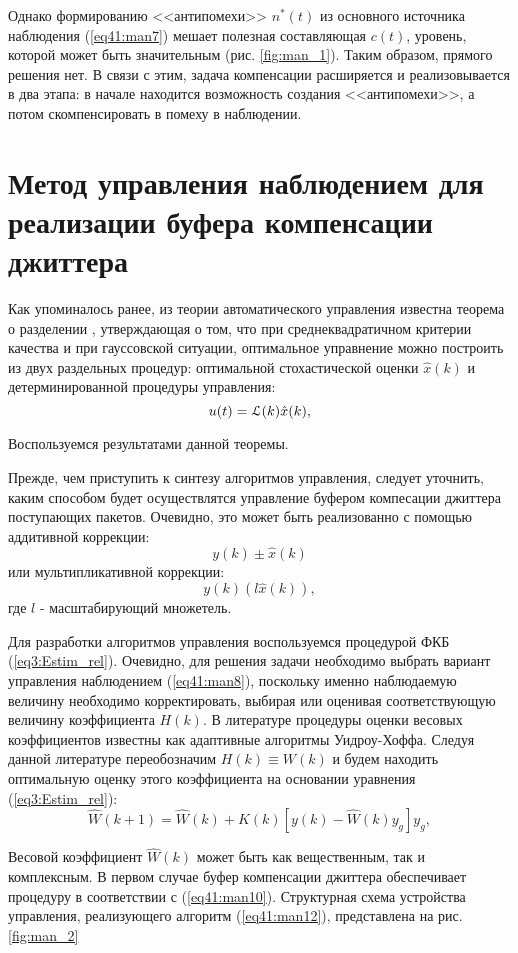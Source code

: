Однако формированию <<антипомехи>> $n^*(t)$ из основного источника наблюдения (\ref{eq41:man7}) мешает полезная составляющая $c(t)$, уровень, которой может быть значительным (рис. \ref{fig:man_1}).
Таким образом, прямого решения нет.
В связи с этим, задача компенсации расширяется и реализовывается в два этапа: в начале находится возможность создания <<антипомехи>>, а потом скомпенсировать в помеху в наблюдении.


\section{Метод управления наблюдением для реализации буфера компенсации джиттера}

Как упоминалось ранее, из теории автоматического управления известна теорема о разделении \cite{seij, red}, утверждающая о том, что при среднеквадратичном критерии качества и
при гауссовской ситуации, оптимальное управнение можно построить из двух раздельных процедур: оптимальной стохастической оценки $\hat x (k)$  и детерминированной процедуры управления:
\begin{equation}\label{eq41:man9}
u(t)=\EuScript{L}(k)\hat x (k),
\end{equation}

Воспользуемся результатами данной теоремы.

Прежде, чем приступить к синтезу алгоритмов управления, следует уточнить, каким способом будет осуществлятся управление буфером компесации джиттера поступающих пакетов. 
Очевидно, это может быть реализованно с помощью аддитивной коррекции:
\begin{equation}\label{eq41:man10}
y(k)\pm\hat x(k)
\end{equation}
или мультипликативной коррекции:
\begin{equation}\label{eq41:man11}
y(k)(l\hat x(k)),
\end{equation}
\noindent где $l$ - масштабирующий множетель.

Для разработки алгоритмов управления воспользуемся процедурой ФКБ (\ref{eq3:Estim_rel}). Очевидно, для решения задачи необходимо выбрать вариант управления наблюдением (\ref{eq41:man8}),
поскольку именно наблюдаемую величину необходимо корректировать, выбирая или оценивая соответствующую величину коэффициента $H(k)$. 
В литературе \cite{windrow,monzigo} процедуры оценки весовых коэффициентов известны как адаптивные алгоритмы Уидроу-Хоффа. 
Следуя данной литературе переобозначим $H(k)\equiv W(k)$ и будем находить оптимальную оценку этого коэффициента на основании уравнения (\ref{eq3:Estim_rel}):
\begin{equation}\label{eq41:man12}
\hat W(k+1)=\hat W(k)+K(k)[y(k)-\hat W(k)y_{g}]y_{g},
\end{equation}

Весовой коэффициент $\hat W(k)$ может быть как вещественным, так и комплексным. 
В первом случае буфер компенсации джиттера обеспечивает процедуру в соответствии с (\ref{eq41:man10}). 
Структурная схема устройства управления, реализующего алгоритм (\ref{eq41:man12}), представлена на рис. \ref{fig:man_2}

